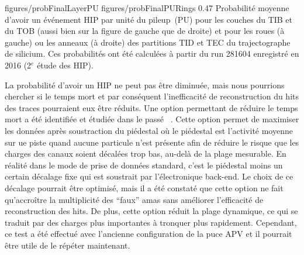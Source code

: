                  {figures/probFinalLayerPU} %
                 {figures/probFinalPURings} %
                 {0.47}       %
                 { Probabilité moyenne d'avoir un événement HIP par unité du pileup~(PU) pour les couches du TIB et du TOB (aussi bien sur la figure  de gauche que de droite) et pour les roues (à gauche) ou les anneaux (à droite) des partitions TID et TEC du trajectographe de silicium. Ces probabilités ont été calculées à partir du run 281604 enregistré en 2016 (2$^e$ étude des HIP).}


La probabilité d'avoir un HIP ne peut pas être diminuée, mais nous pourrions chercher si le temps mort et par conséquent l’inefficacité de reconstruction du hits des traces pourraient eux être réduits. Une option permettant de réduire le temps mort a été identifiée et étudiée dans le passé ~\cite{website:hitLoss}. Cette option permet de maximiser les données après soustraction du piédestal où le piédestal est l’activité moyenne sur ue piste quand aucune particule n’est présente afin de réduire le risque que les charges des canaux soient décalées trop bas, au-delà de la plage mesurable. En réalité dans le mode de prise de données standard, c'est le piédestal moins un certain décalage fixe qui est soustrait par l’électronique back-end. Le choix de ce décalage pourrait être optimisé, mais il a été constaté que cette option ne fait qu’accroître la multiplicité des ``faux'' amas  sans améliorer l’efficacité de reconstruction des hits. De plus, cette option réduit la plage dynamique, ce qui se traduit par des charges plus importantes à tronquer plus rapidement. Cependant, ce test a été effectué avec l'ancienne configuration de la puce APV et il pourrait être utile de le répéter maintenant.

